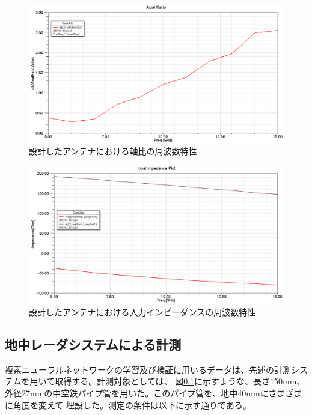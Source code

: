 \documentclass[11pt,a4paper,uplatex,draft]{ujarticle}
\begin{document}
  \begin{figure}[hbtp]
    \centering
    \includegraphics[keepaspectratio, width=130mm]{Images/axial_ratio.png}
    \caption{設計したアンテナにおける軸比の周波数特性}
    \label{fig:axial_ratio}
  \end{figure}

  \begin{figure}[hbtp]
    \centering
    \includegraphics[keepaspectratio, width=130mm]{Images/spiral_impedance.png}
    \caption{設計したアンテナにおける入力インピーダンスの周波数特性}
    \label{fig:spiral_antenna_impedance}
  \end{figure}

\newpage

  \subsection{地中レーダシステムによる計測}
  複素ニューラルネットワークの学習及び検証に用いるデータは、先述の計測システムを用いて取得する。計測対象としては、
  図\ref{}に示すような、長さ150mm、外径27mmの中空鉄パイプ管を用いた。このパイプ管を、地中40mmにさまざまに角度を変えて
  埋設した。測定の条件は以下に示す通りである。
\end{document}
